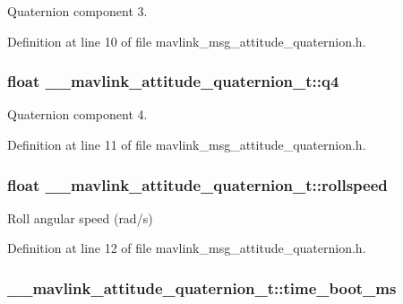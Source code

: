 Quaternion component 3. 



Definition at line 10 of file mavlink\-\_\-msg\-\_\-attitude\-\_\-quaternion.\-h.

\hypertarget{struct____mavlink__attitude__quaternion__t_a4c78a9e744406f980fab7ff67613b14d}{
\subsubsection[{q4}]{\setlength{\rightskip}{0pt plus 5cm}float \-\_\-\-\_\-mavlink\-\_\-attitude\-\_\-quaternion\-\_\-t\-::q4}}\label{struct____mavlink__attitude__quaternion__t_a4c78a9e744406f980fab7ff67613b14d}


Quaternion component 4. 



Definition at line 11 of file mavlink\-\_\-msg\-\_\-attitude\-\_\-quaternion.\-h.

\hypertarget{struct____mavlink__attitude__quaternion__t_aa6ec530191df4da1f482533321684902}{
\subsubsection[{rollspeed}]{\setlength{\rightskip}{0pt plus 5cm}float \-\_\-\-\_\-mavlink\-\_\-attitude\-\_\-quaternion\-\_\-t\-::rollspeed}}\label{struct____mavlink__attitude__quaternion__t_aa6ec530191df4da1f482533321684902}


Roll angular speed (rad/s) 



Definition at line 12 of file mavlink\-\_\-msg\-\_\-attitude\-\_\-quaternion.\-h.

\hypertarget{struct____mavlink__attitude__quaternion__t_af6846c94b303788cf54d7861a939ab15}{
\subsubsection[{time\-\_\-boot\-\_\-ms}]{ \-\_\-\-\_\-mavlink\-\_\-attitude\-\_\-quaternion\-\_\-t\-::time\-\_\-boot\-\_\-ms}}\label{struct____mavlink__attitude__quaternion__t_af6846c94b303788cf54d7861a939ab15}


